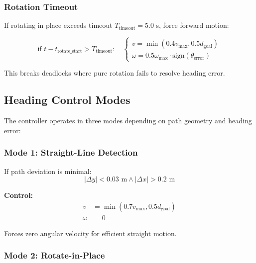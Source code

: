 \subsubsection{Rotation Timeout}

If rotating in place exceeds timeout $T_{\text{timeout}} = 5.0$ s, force forward motion:

\begin{equation}
\text{if } t - t_{\text{rotate\_start}} > T_{\text{timeout}}: \quad \begin{cases}
v = \min(0.4 v_{\max}, 0.5 d_{\text{goal}}) \\
\omega = 0.5 \omega_{\max} \cdot \text{sign}(\theta_{\text{error}})
\end{cases}
\label{eq:rotation_timeout}
\end{equation}

This breaks deadlocks where pure rotation fails to resolve heading error.

\subsection{Heading Control Modes}

The controller operates in three modes depending on path geometry and heading error:

\subsubsection{Mode 1: Straight-Line Detection}

If path deviation is minimal:
\begin{equation}
|\Delta y| < 0.03 \text{ m} \land |\Delta x| > 0.2 \text{ m}
\label{eq:straight_line_condition}
\end{equation}

\textbf{Control:}
\begin{equation}
\begin{aligned}
v &= \min(0.7 v_{\max}, 0.5 d_{\text{goal}}) \\
\omega &= 0
\end{aligned}
\label{eq:straight_control}
\end{equation}

Forces zero angular velocity for efficient straight motion.

\subsubsection{Mode 2: Rotate-in-Place}

